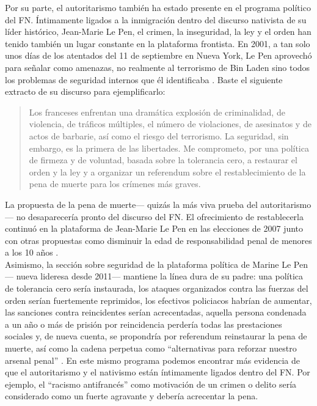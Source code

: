Por su parte, el autoritarismo también ha estado presente en el programa político del FN. Íntimamente ligados a la inmigración dentro del discurso nativista de su líder histórico, Jean-Marie Le Pen, el crimen, la inseguridad, la ley y el orden han tenido también un lugar constante en la plataforma frontista. En 2001, a tan solo unos días de los atentados del 11 de septiembre en Nueva York, Le Pen aprovechó para señalar como amenazas, no realmente al terrorismo de Bin Laden sino todos los problemas de seguridad internos que él identificaba \parencite{ViePublique01}. Baste el siguiente extracto de su discurso para ejemplificarlo:
\begin{quote}
Los franceses enfrentan una dramática explosión de criminalidad, de violencia, de tráficos múltiples, el número de violaciones, de asesinatos y de actos de barbarie, así como el riesgo del terrorismo. La seguridad, sin embargo, es la primera de las libertades. Me comprometo, por una política de firmeza y de voluntad, basada sobre la tolerancia cero, a restaurar el orden y la ley y a organizar un referendum sobre el restablecimiento de la pena de muerte para los crímenes más graves. 
\end{quote}

La propuesta de la pena de muerte--- quizás la más viva prueba del autoritarismo--- no desaparecería pronto del discurso del FN. El ofrecimiento de restablecerla continuó en la plataforma de Jean-Marie Le Pen en las elecciones de 2007 junto con otras propuestas como disminuir la edad de responsabilidad penal de menores a los 10 años \parencite{LObs07}.\\ 

Asimismo, la sección sobre seguridad de la plataforma política de Marine Le Pen--- nueva lideresa desde 2011--- mantiene la línea dura de su padre: una política de tolerancia cero sería instaurada, los ataques organizados contra las fuerzas del orden serían fuertemente reprimidos, los efectivos policiacos habrían de aumentar, las sanciones contra reincidentes serían acrecentadas, aquella persona condenada a un año o más de prisión por reincidencia perdería todas las prestaciones sociales y, de nueva cuenta, se propondría por referendum reinstaurar la pena de muerte, así como la cadena perpetua como ``alternativas para reforzar nuestro arsenal penal'' \parencite{LePen12}. En este mismo programa podemos encontrar más evidencia de que el autoritarismo y el nativismo están íntimamente ligados dentro del FN. Por ejemplo, el ``racismo antifrancés'' como motivación de un crimen o delito sería considerado como un fuerte agravante y debería acrecentar la pena.\\

